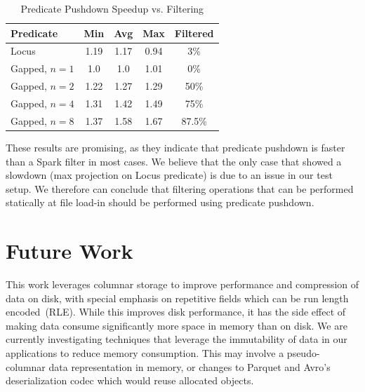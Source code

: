 \documentclass{acm_proc_article-sp}
\begin{document}
\begin{table}[h]
\caption{Predicate Pushdown Speedup vs. Filtering}
\label{tab:filter-vs-predicate}
\begin{center}
\begin{tabular}{| l | c  c c | c |}
\hline
\bf Predicate & \bf Min & \bf Avg & \bf Max & \bf Filtered \\
\hline
Locus & 1.19 & 1.17 & 0.94 & 3\% \\
Gapped, $n = 1$ & 1.0 & 1.0 & 1.01 & 0\% \\
Gapped, $n = 2$ & 1.22 & 1.27 & 1.29 & 50\% \\
Gapped, $n = 4$ & 1.31 & 1.42 & 1.49 & 75\% \\
Gapped, $n = 8$ & 1.37 & 1.58 & 1.67 & 87.5\% \\
\hline
\end{tabular}
\end{center}
\end{table}

These results are promising, as they indicate that predicate pushdown is faster than a Spark filter in most cases. We believe that the
only case that showed a slowdown (max projection on Locus predicate) is due to an issue in our test setup. We therefore can conclude
that filtering operations that can be performed statically at file load-in should be performed using predicate pushdown.

\section{Future Work}
\label{sec:future-work}

This work leverages columnar storage to improve performance and compression of data on disk,
with special emphasis on repetitive fields which can be run length encoded~(RLE). While this improves
disk performance, it has the side effect of making data consume significantly more space in memory
than on disk. We are currently investigating techniques that leverage the immutability of data in our
applications to reduce memory consumption. This may involve a pseudo-columnar data representation
in memory, or changes to Parquet and Avro's deserialization codec which would reuse allocated objects.
\end{document}
